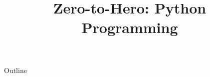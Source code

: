 \documentclass[xcolor=dvipsnames,compress,t,pdf]{beamer}
\title[\insertframenumber /\inserttotalframenumber]{Zero-to-Hero: Python Programming}
\begin{document}
	\begin{frame}
	\titlepage
	\end{frame}
	
	\begin{frame}{Outline}
	    \tableofcontents
	\end{frame}

	
	
	
\end{document}
